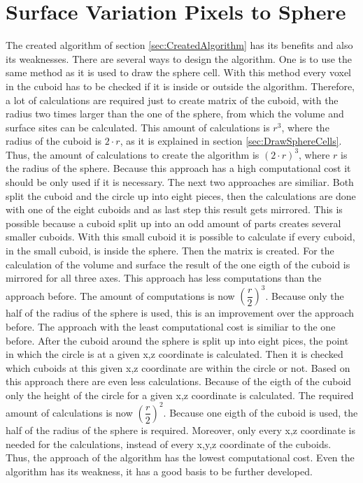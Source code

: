 \section{Surface Variation Pixels to Sphere}
The created algorithm of section \ref{sec:CreatedAlgorithm} has its benefits and also its weaknesses. There are several ways to design the algorithm. One is to use the same method as it is used to draw the sphere cell. With this method every voxel in the cuboid has to be checked if it is inside or outside the algorithm. Therefore, a lot of calculations are required just to create matrix of the cuboid, with the radius two times larger than the one of the sphere, from which the volume and surface sites can be calculated. This amount of calculations is $r^{3}$, where the radius of the cuboid is $2 \cdot r$, as it is explained in section \ref{sec:DrawSphereCells}. Thus, the amount of calculations to create the algorithm is $(2 \cdot r)^{3}$, where $r$ is the radius of the sphere. Because this approach has a high computational cost it should be only used if it is necessary. \newline
The next two approaches are similiar. Both split the cuboid and the circle up into eight pieces, then the calculations are done with one of the eight cuboids and as last step this result gets mirrored. This is possible because a cuboid split up into an odd amount of parts creates several smaller cuboids. With this small cuboid it is possible to calculate if every cuboid, in the small cuboid, is inside the sphere. Then the matrix is created. For the calculation of the volume and surface the result of the one eigth of the cuboid is mirrored for all three axes. This approach has less computations than the approach before. The amount of computations is now $(\dfrac{r}{2})^{3}$. Because only the half of the radius of the sphere is used, this is an improvement over the approach before. \newline
The approach with the least computational cost is similiar to the one before. After the cuboid around the sphere is split up into eight pices, the point in which the circle is at a given x,z coordinate is calculated. Then it is checked which cuboids at this given x,z coordinate are within the circle or not. Based on this approach there are even less calculations. Because of the eigth of the cuboid only the height of the circle for a given x,z coordinate is calculated. The required amount of calculations is now $(\dfrac{r}{2})^{2}$. Because one eigth of the cuboid is used, the half of the radius of the sphere is required. Moreover, only every x,z coordinate is needed for the calculations, instead of every x,y,z coordinate of the cuboids. Thus, the approach of the algorithm has the lowest computational cost. Even the algorithm has its weakness, it has a good basis to be further developed.

